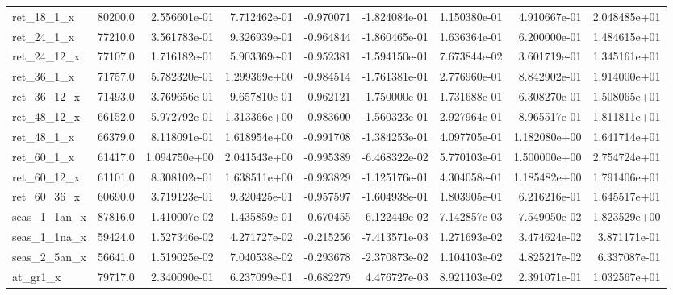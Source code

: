 \documentclass[10pt]{article}
\begin{document}
\begin{landscape}
\begin{longtable}{lrrrrrrrr}
ret\_18\_1\_x              &   80200.0 &  2.556601e-01 &  7.712462e-01 &     -0.970071 & -1.824084e-01 &  1.150380e-01 &  4.910667e-01 &  2.048485e+01 \\
ret\_24\_1\_x              &   77210.0 &  3.561783e-01 &  9.326939e-01 &     -0.964844 & -1.860465e-01 &  1.636364e-01 &  6.200000e-01 &  1.484615e+01 \\
ret\_24\_12\_x             &   77107.0 &  1.716182e-01 &  5.903369e-01 &     -0.952381 & -1.594150e-01 &  7.673844e-02 &  3.601719e-01 &  1.345161e+01 \\
ret\_36\_1\_x              &   71757.0 &  5.782320e-01 &  1.299369e+00 &     -0.984514 & -1.761381e-01 &  2.776960e-01 &  8.842902e-01 &  1.914000e+01 \\
ret\_36\_12\_x             &   71493.0 &  3.769656e-01 &  9.657810e-01 &     -0.962121 & -1.750000e-01 &  1.731688e-01 &  6.308270e-01 &  1.508065e+01 \\
ret\_48\_12\_x             &   66152.0 &  5.972792e-01 &  1.313366e+00 &     -0.983600 & -1.560323e-01 &  2.927964e-01 &  8.965517e-01 &  1.811811e+01 \\
ret\_48\_1\_x              &   66379.0 &  8.118091e-01 &  1.618954e+00 &     -0.991708 & -1.384253e-01 &  4.097705e-01 &  1.182080e+00 &  1.641714e+01 \\
ret\_60\_1\_x              &   61417.0 &  1.094750e+00 &  2.041543e+00 &     -0.995389 & -6.468322e-02 &  5.770103e-01 &  1.500000e+00 &  2.754724e+01 \\
ret\_60\_12\_x             &   61101.0 &  8.308102e-01 &  1.638511e+00 &     -0.993829 & -1.125176e-01 &  4.304058e-01 &  1.185482e+00 &  1.791406e+01 \\
ret\_60\_36\_x             &   60690.0 &  3.719123e-01 &  9.320425e-01 &     -0.957597 & -1.604938e-01 &  1.803905e-01 &  6.216216e-01 &  1.645517e+01 \\
seas\_1\_1an\_x            &   87816.0 &  1.410007e-02 &  1.435859e-01 &     -0.670455 & -6.122449e-02 &  7.142857e-03 &  7.549050e-02 &  1.823529e+00 \\
seas\_1\_1na\_x            &   59424.0 &  1.527346e-02 &  4.271727e-02 &     -0.215256 & -7.413571e-03 &  1.271693e-02 &  3.474624e-02 &  3.871171e-01 \\
seas\_2\_5an\_x            &   56641.0 &  1.519025e-02 &  7.040538e-02 &     -0.293678 & -2.370873e-02 &  1.104103e-02 &  4.825217e-02 &  6.337087e-01 \\
at\_gr1\_x                &   79717.0 &  2.340090e-01 &  6.237099e-01 &     -0.682279 &  4.476727e-03 &  8.921103e-02 &  2.391071e-01 &  1.032567e+01 \\

\end{longtable}
\end{landscape}
\end{document}
